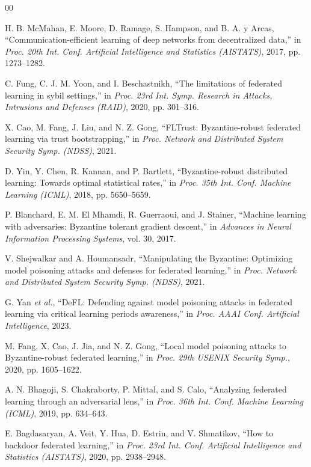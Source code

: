 \documentclass[conference]{IEEEtran}
\begin{document}
\clearpage
\begin{thebibliography}{00}

H. B. McMahan, E. Moore, D. Ramage, S. Hampson, and B. A. y Arcas, ``Communication-efficient learning of deep networks from decentralized data,'' in \emph{Proc. 20th Int. Conf. Artificial Intelligence and Statistics (AISTATS)}, 2017, pp. 1273--1282.

C. Fung, C. J. M. Yoon, and I. Beschastnikh, ``The limitations of federated learning in sybil settings,'' in \emph{Proc. 23rd Int. Symp. Research in Attacks, Intrusions and Defenses (RAID)}, 2020, pp. 301--316.

X. Cao, M. Fang, J. Liu, and N. Z. Gong, ``FLTrust: Byzantine-robust federated learning via trust bootstrapping,'' in \emph{Proc. Network and Distributed System Security Symp. (NDSS)}, 2021.

D. Yin, Y. Chen, R. Kannan, and P. Bartlett, ``Byzantine-robust distributed learning: Towards optimal statistical rates,'' in \emph{Proc. 35th Int. Conf. Machine Learning (ICML)}, 2018, pp. 5650--5659.

P. Blanchard, E. M. El Mhamdi, R. Guerraoui, and J. Stainer, ``Machine learning with adversaries: Byzantine tolerant gradient descent,'' in \emph{Advances in Neural Information Processing Systems}, vol. 30, 2017.

V. Shejwalkar and A. Houmansadr, ``Manipulating the Byzantine: Optimizing model poisoning attacks and defenses for federated learning,'' in \emph{Proc. Network and Distributed System Security Symp. (NDSS)}, 2021.

G. Yan \emph{et al.}, ``DeFL: Defending against model poisoning attacks in federated learning via critical learning periods awareness,'' in \emph{Proc. AAAI Conf. Artificial Intelligence}, 2023.

M. Fang, X. Cao, J. Jia, and N. Z. Gong, ``Local model poisoning attacks to Byzantine-robust federated learning,'' in \emph{Proc. 29th USENIX Security Symp.}, 2020, pp. 1605--1622.

A. N. Bhagoji, S. Chakraborty, P. Mittal, and S. Calo, ``Analyzing federated learning through an adversarial lens,'' in \emph{Proc. 36th Int. Conf. Machine Learning (ICML)}, 2019, pp. 634--643.

E. Bagdasaryan, A. Veit, Y. Hua, D. Estrin, and V. Shmatikov, ``How to backdoor federated learning,'' in \emph{Proc. 23rd Int. Conf. Artificial Intelligence and Statistics (AISTATS)}, 2020, pp. 2938--2948.


\end{thebibliography}
\end{document}
